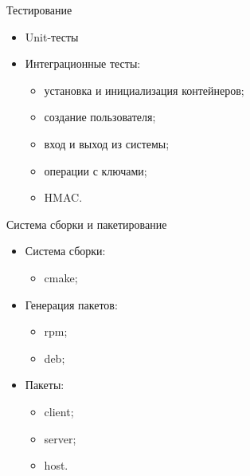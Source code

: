 \documentclass[utf8, 11pt]{beamer}
\begin{document}
\begin{frame}{Тестирование}
\begin{itemize}
\item Unit-тесты
\item Интеграционные тесты:
	\begin{itemize}
	\item установка и инициализация контейнеров;
	\item создание пользователя;
	\item вход и выход из системы;
	\item операции с ключами;
	\item HMAC.
	\end{itemize}
\end{itemize}
\vspace*{\fill}
\end{frame}

\begin{frame}{Система сборки и пакетирование}
\begin{itemize}
\item Система сборки:
	\begin{itemize}
	\item cmake;
	\end{itemize}
\item Генерация пакетов:
	\begin{itemize}
	\item rpm;
	\item deb;
	\end{itemize}
\item Пакеты:
	\begin{itemize}
	\item client;
	\item server;
	\item host.
	\end{itemize}
\end{itemize}
\vspace*{\fill}
\end{frame}
\end{document}

